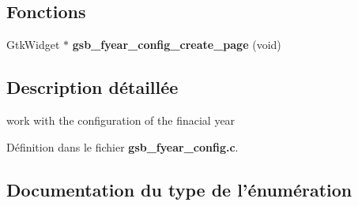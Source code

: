 \subsection*{Fonctions}
\begin{DoxyCompactItemize}
\item 
GtkWidget $\ast$ {\bf gsb\_\-fyear\_\-config\_\-create\_\-page} (void)
\end{DoxyCompactItemize}


\subsection{Description détaillée}
work with the configuration of the finacial year 

Définition dans le fichier {\bf gsb\_\-fyear\_\-config.c}.



\subsection{Documentation du type de l'énumération}
